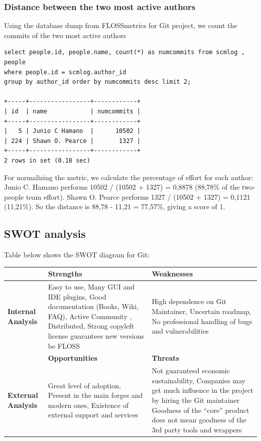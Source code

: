 \documentclass[a4paper,10pt]{article}
\begin{document}
\subsubsection{Distance between the two most active authors}
Using the database dump from FLOSSmetrics for Git project, we count the commits
of the two most active authors
\begin{verbatim}
select people.id, people.name, count(*) as numcommits from scmlog , people 
where people.id = scmlog.author_id 
group by author_id order by numcommits desc limit 2;

+-----+-----------------+------------+
| id  | name            | numcommits |
+-----+-----------------+------------+
|   5 | Junio C Hamano  |      10502 |
| 224 | Shawn O. Pearce |       1327 |
+-----+-----------------+------------+
2 rows in set (0.18 sec)
\end{verbatim}
For normalizing the metric, we calculate the percentage of effort for each
author: Junio C. Hamano performs 10502 / (10502 + 1327) = 0,8878 (88,78\% of the
two-people team effort). Shawn O. Pearce performs 1327 / (10502 + 1327) = 0,1121
(11,21\%). So the distance is 88,78 - 11,21 = 77,57\%, giving a score of 1.

\subsection{SWOT analysis}
Table below shows the SWOT\cite{swot_analysis} diagram for Git:
\begin{center}
    \begin{tabular}{ | p{1.5cm} | p{5cm} | p{5cm} |}
    \hline
	  & \textbf{Strengths} & \textbf{Weaknesses} \\ \hline
    \textbf{Internal Analysis} & 
    Easy to use,
    Many GUI and IDE plugins,
    Good documentation (Books, Wiki, FAQ),
    Active Community ,
    Distributed,
    Strong copyleft license guarantees new versions be FLOSS
    & High dependence on Git Maintainer,
    Uncertain roadmap, 
    No professional handling of bugs and vulnerabilities \\ \hline
    & \textbf{Opportunities} & \textbf{Threats} \\ \hline
    \textbf{External Analysis} & 
    Great level of adoption,
    Present in the main forges and modern ones,
    Existence of external support and services
    & Not guaranteed economic sustainability,
    Companies may get much influence in the project by hiring the Git maintainer
    Goodness of the ``core'' product does not mean goodness of the 3rd party
tools and wrappers    
\\ \hline
    \end{tabular}
\end{center}
\end{document}
